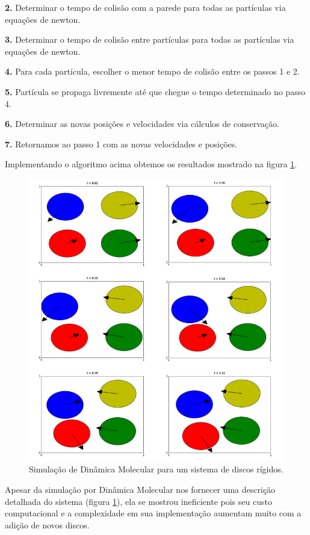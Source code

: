 \documentclass[%
reprint,
amsmath,amssymb,
aps,
12pt
]{revtex4-1}
\begin{document}
\textbf{2.} Determinar o tempo de colisão com a parede para todas as partículas via equações de newton.

\textbf{3.} Determinar o tempo de colisão entre partículas para todas as partículas via equações de newton.

\textbf{4.} Para cada partícula, escolher o menor tempo de colisão entre os passos 1 e 2.

\textbf{5.} Partícula se propaga livremente até que chegue o tempo determinado no passo 4.

\textbf{6.} Determinar as novas posições e velocidades via cálculos de conservação.

\textbf{7.} Retornamos ao passo 1 com as novas velocidades e posições.


Implementando o algoritmo acima obtemos os resultados mostrado na figura \ref{dm2}.

\begin{figure}[!h]
	\centering
	\includegraphics[scale=0.15]{dm2.png}
	\caption{Simulação de Dinâmica Molecular para um sistema de discos rígidos.
		\label{dm2}}
\end{figure}



Apesar da simulação por Dinâmica Molecular nos fornecer uma descrição detalhada do sistema (figura \ref{dm2}), ela se mostrou ineficiente pois seu custo computacional e a complexidade em sua implementação aumentam muito com a adição de novos discos. 
\end{document}
